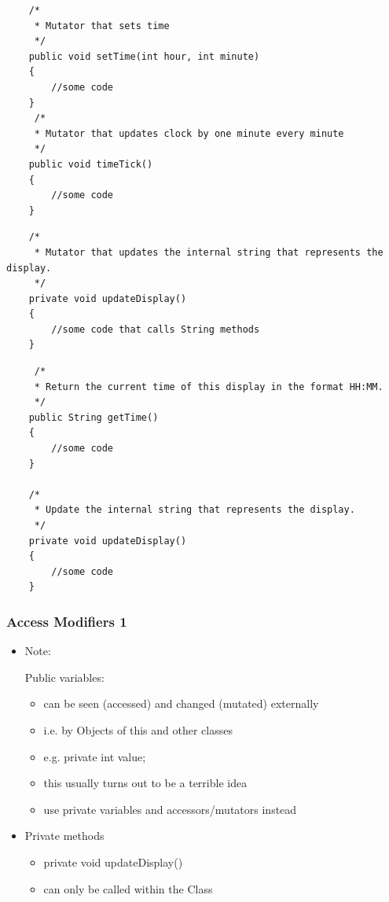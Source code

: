 \documentclass{beamer}
\begin{document}
\begin{frame}[fragile]
\tiny
\begin{block}{}
\begin{lstlisting}
    /*
     * Mutator that sets time
     */
    public void setTime(int hour, int minute)
    {
        //some code
    }
     /*
     * Mutator that updates clock by one minute every minute
     */
    public void timeTick()
    {
        //some code
    }
\end{lstlisting}
\end{block}

\end{frame}


\begin{frame}[fragile]
\tiny
\begin{block}{}
\begin{lstlisting}
    /*
     * Mutator that updates the internal string that represents the display.
     */
    private void updateDisplay()
    {
        //some code that calls String methods
    }
\end{lstlisting}
\end{block}
\end{frame}

\begin{frame}[fragile]
\tiny
\begin{block}{}
\begin{lstlisting}
     /*
     * Return the current time of this display in the format HH:MM.
     */
    public String getTime()
    {
        //some code
    }
    
    /*
     * Update the internal string that represents the display.
     */
    private void updateDisplay()
    {
        //some code
    }
\end{lstlisting}
\end{block}
\end{frame}

\begin{frame}
\frametitle{Access Modifiers 1}
\begin{itemize}
\item Note: 

Public variables:

\begin{itemize}
\item can be seen (accessed) and changed (mutated) externally
\item i.e. by Objects of this and other classes
\bigskip
\item e.g. private int value; 
\bigskip
\item this usually turns out to be a terrible idea
\item use private variables and accessors/mutators instead
\end{itemize}
\item Private methods

\begin{itemize}
\item private void updateDisplay()
\item can only be called within the Class
\end{itemize}
\end{itemize}
\end{frame}
\end{document}
